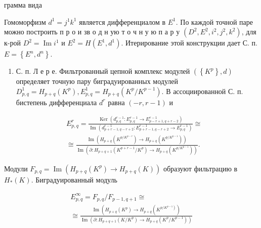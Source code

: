 \documentclass[10pt]{article}
\begin{document}
грамма вида



Гомоморфизм $d^{1}=j^{1} k^{1}$ является дифференциалом в $E^{1}$. По каждой точной паре можно построить п р о и зв о д н ую т о ч н у ю п а р у $\left(D^{2}, E^{2}, i^{2}, j^{2}, k^{2}\right)$, для к-рой $D^{2}=\operatorname{Im} i^{1}$ и $E^{2}=H\left(E^{1}, d^{1}\right)$. Итерирование этой конструкции дает С. п. $E=\left\{E^{n}, d^{n}\right\}$.



\begin{enumerate}

  \item С. п. Л е р е. Фильтрованный цепной комплекс модулей $\left(\left\{K^{p}\right\}, d\right)$ определяет точную пару биградуированных модулей $D_{p, q}^{1}=H_{p+q}\left(K^{p}\right), E_{p, q}^{1}=H_{p+q}\left(K^{p} / K^{p-1}\right)$. В ассоциированной С. п. бистепень дифференциала $d^{r}$ равна $(-r, r-1)$ и

\end{enumerate}



\[

\begin{aligned}

& E_{p, q}^{r}=\frac{\operatorname{Ker}\left(d_{p, q}^{r-1}: E_{p, q}^{r-1} \longrightarrow E_{p-r+1, q+r-2}^{r-1}\right)}{\operatorname{Im}\left(d_{p+r-1, q-r+2}^{r-1}: E_{p+r-1, q-r+2}^{r-1} \longrightarrow E_{p, q}^{r-1}\right)} \cong \\

& \cong \frac{\operatorname{Im}\left(H_{p+q}\left(K^{p / K^{p-r}}\right) \longrightarrow H_{p+q}\left(K^{p / K^{p-1}}\right)\right)}{\operatorname{Im}\left(\partial: H_{p+q+1}\left(K^{p+r-1} / K^{p}\right) \longrightarrow H_{p+q}\left(K^{p / K^{p-1}}\right)\right)} .

\end{aligned}

\]



Модули $F_{p, q}=\operatorname{Im}\left(H_{p+q}\left(K^{p}\right) \rightarrow H_{p+q}(K)\right)$ образуют фильтрацию в $H_{*}(K)$. Биградуированный модуль



\[

\begin{gathered}

E_{p, q}^{\infty}=F_{p, q} / F_{p-1, q+1} \cong \\

\cong \frac{\operatorname{Im}\left(H_{p+q}\left(K^{p}\right) \longrightarrow H_{p+q}\left(K^{\left.p / K^{p-1}\right)}\right)\right.}{\operatorname{Im}\left(\partial: H_{p+q+1}\left(K / K^{p}\right) \longrightarrow H_{p+q}\left(K^{p} / K^{p-1}\right)\right)}

\end{gathered}

\]
\end{document}
